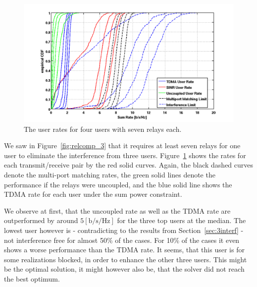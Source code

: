 \paragraph{}
\begin{figure}[h]
\centering
  \includegraphics[width=\linewidth]{images/4user_userrate.png}
\caption{The user rates for  four users with seven relays each.}
\label{fig:4user_userrate}
\end{figure}
We saw in Figure~\ref{fig:relcomp_3} that it requires at least seven relays for one user to eliminate the interference from three users.
Figure~\ref{fig:4user_userrate} shows the rates for each transmit/receive pair by the red solid curves.
Again, the black dashed curves denote the multi-port matching rates, the green solid lines denote the performance if the relays were uncoupled, and the blue solid line shows the TDMA rate for each user under the sum power constraint.


We observe at first, that the uncoupled rate as well as the TDMA rate are outperformed by around $5 \left[\text{b/s/Hz}\right]$ for the three top users at the median.
The lowest user however is - contradicting to the results from Section~\ref{sec:3interf} - not interference free for almost 50\% of the cases.
For 10\% of the cases it even shows a worse performance than the TDMA rate.
It seems, that this user is for some realizations blocked, in order to enhance the other three users.
This might be the optimal solution, it might however also be, that the solver did not reach the best optimum.

